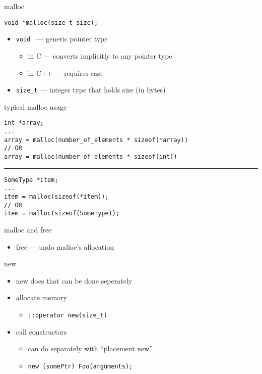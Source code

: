 \begin{frame}[fragile,label=mallocPrototype]{malloc}
\lstset{language=C++,style=small}
\begin{lstlisting}
void *malloc(size_t size);
\end{lstlisting}
\begin{itemize}
\item \texttt{void \*} --- generic pointer type
    \begin{itemize}
    \item in C --- converts implicitly to any pointer type
    \item in C++ --- requires cast
    \end{itemize}
\item \texttt{size\_t} --- integer type that holds size (in bytes)
\end{itemize}
\end{frame}

\begin{frame}[fragile,label=mallocUsage1]{typical malloc usage}
\lstset{language=C++,style=smaller}
\begin{lstlisting}
int *array;
...
array = malloc(number_of_elements * sizeof(*array))
// OR
array = malloc(number_of_elements * sizeof(int))
\end{lstlisting}
\hrule
\begin{lstlisting}
SomeType *item;
...
item = malloc(sizeof(*item));
// OR
item = malloc(sizeof(SomeType));
\end{lstlisting}
\end{frame}

\begin{frame}{malloc and free}
\begin{itemize}
\item free --- undo malloc's allocation
\end{itemize}
\end{frame}

\begin{frame}[fragile,label=newParts]{new}
\lstset{language=C++}
\begin{itemize}
    \item new does  that can be done seperately
    \vspace{.5cm}
    \item allocate memory
        \begin{itemize}
        \item \texttt{::operator new(size\_t)}
        \end{itemize}
    \item call constructors
        \begin{itemize}
        \item can do separately with ``placement new''
        \item \lstinline|new (somePtr) Foo(arguments);|
        \end{itemize}
    \end{itemize}
\end{frame}

